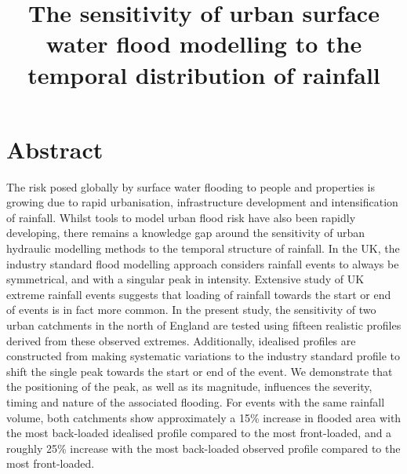 \documentclass[APA,Times2COL]{WileyNJDv5}
\title{\textbf{The sensitivity of urban surface water flood modelling to the temporal distribution of rainfall}}
\date{}
\begin{document}
\maketitle
\vspace{-1.5cm}

\section{Abstract}

The risk posed globally by surface water flooding to people and properties is growing due to rapid urbanisation, infrastructure development and intensification of rainfall. Whilst tools to model urban flood risk have also been rapidly developing, there remains a knowledge gap around the sensitivity of urban hydraulic modelling methods to the temporal structure of rainfall. In the UK, the industry standard flood modelling approach considers rainfall events to always be symmetrical, and with a singular peak in intensity. Extensive study of UK extreme rainfall events suggests that loading of rainfall towards the start or end of events is in fact more common. In the present study, the sensitivity of two urban catchments in the north of England are tested using fifteen realistic profiles derived from these observed extremes. Additionally, idealised profiles are constructed from making systematic variations to the industry standard profile to shift the single peak towards the start or end of the event. We demonstrate that the positioning of the peak, as well as its magnitude, influences the severity, timing and nature of the associated flooding. For events with the same rainfall volume, both catchments show approximately a 15\% increase in flooded area with the most back-loaded idealised profile compared to the most front-loaded, and a roughly 25\% increase with the most back-loaded observed profile compared to the most front-loaded. 

\end{document}
